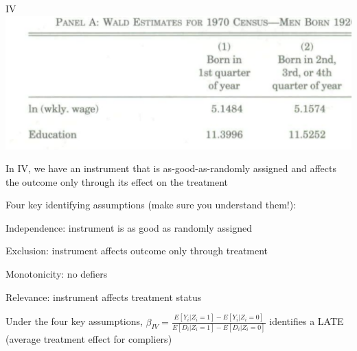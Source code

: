 \documentclass[11pt,english,handout]{beamer}
\newenvironment{wideitemize}{\itemize\addtolength{\itemsep}{10pt}}{\enditemize}
\begin{document}
\begin{frame}{IV}
	\includegraphics[width = 0.5\linewidth]{../Chapter7/ak-first-stage-basic}
	
	\begin{wideitemize}
		\item
		In IV, we have an instrument that is as-good-as-randomly assigned and affects the outcome only through its effect on the treatment
		
		\item
		Four key identifying assumptions (make sure you understand them!):
		\begin{wideitemize}
			\item
			Independence: instrument is as good as randomly assigned	
			
			\item
			Exclusion: instrument affects outcome only through treatment
			
			\item
			Monotonicity: no defiers
			
			\item
			Relevance: instrument affects treatment status
		\end{wideitemize}	
		 
		
		\pause
		\item
		Under the four key assumptions, $\beta_{IV} = \frac{ E[Y_i | Z_i = 1] - E[Y_i | Z_i = 0] }{E[D_i | Z_i = 1] - E[D_i | Z_i = 0]}$ identifies a LATE (average treatment effect for compliers) 
	\end{wideitemize}
\end{frame}
\end{document}
